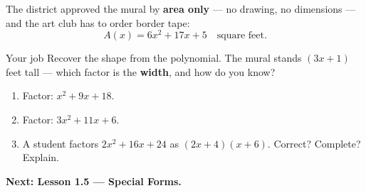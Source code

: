 \documentclass[aspectratio=169, 11pt]{beamer}
\begin{document}
\begin{frame}[t, plain]
  The district approved the mural by \textbf{area only} --- no drawing, no dimensions --- and the
  art club has to order border tape:
  \[ A(x) = 6x^2+17x+5 \quad \text{square feet.} \]
  \begin{block}{Your job}
    Recover the shape from the polynomial. The mural stands $(3x+1)$ feet tall --- which factor is
    the \textbf{width}, and how do you know?
  \end{block}
\end{frame}

\begin{frame}[t, plain]
  \begin{enumerate}
    \setlength{\itemsep}{0.35cm}
    \item Factor: $x^2+9x+18$.
    \item Factor: $3x^2+11x+6$.
    \item A student factors $2x^2+16x+24$ as $(2x+4)(x+6)$. Correct? Complete? Explain.
  \end{enumerate}
  \vspace{0.3cm}
  {\color{royal}\bfseries Next: Lesson 1.5 --- Special Forms.}
\end{frame}
\end{document}
